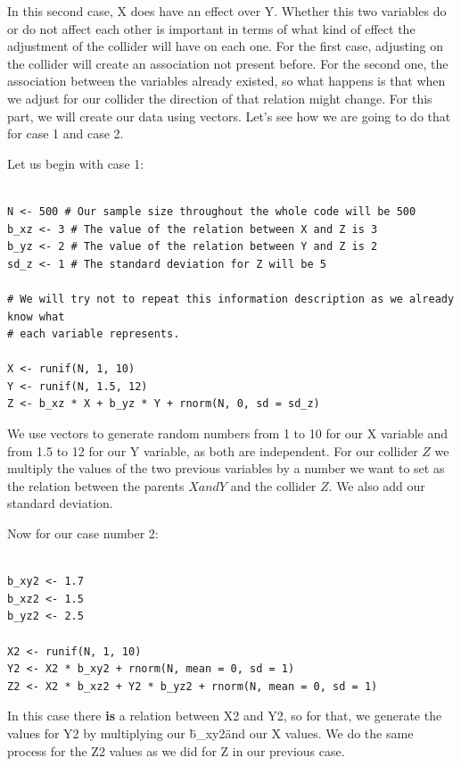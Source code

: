\documentclass{article}
\begin{document}
In this second case, X does have an effect over Y.
Whether this two variables do or do not affect each other is important in terms
of what kind of effect the adjustment of the collider will have on each one. For
the first case, adjusting on the collider will create an association not present
before. For the second one, the association between the variables already existed,
so what happens is that when we adjust for our collider the direction of that 
relation might change. 
For this part, we will create our data using vectors. Let's see how we are going 
to do that for case 1 and case 2.

Let us begin with case 1:

\begin{lstlisting}

N <- 500 # Our sample size throughout the whole code will be 500
b_xz <- 3 # The value of the relation between X and Z is 3
b_yz <- 2 # The value of the relation between Y and Z is 2
sd_z <- 1 # The standard deviation for Z will be 5

# We will try not to repeat this information description as we already know what
# each variable represents.

X <- runif(N, 1, 10)
Y <- runif(N, 1.5, 12)
Z <- b_xz * X + b_yz * Y + rnorm(N, 0, sd = sd_z)

\end{lstlisting}

We use vectors to generate random numbers from 1 to 10 for our X variable and 
from 1.5 to 12 for our Y variable, as both are independent. For our collider \(Z\)
we multiply the values of the two previous variables by a number we want to set
as the relation between the parents \(X and Y\) and the collider \(Z\). We also add
our standard deviation.

Now for our case number 2:

\begin{lstlisting}

b_xy2 <- 1.7 
b_xz2 <- 1.5
b_yz2 <- 2.5

X2 <- runif(N, 1, 10)
Y2 <- X2 * b_xy2 + rnorm(N, mean = 0, sd = 1)
Z2 <- X2 * b_xz2 + Y2 * b_yz2 + rnorm(N, mean = 0, sd = 1)

\end{lstlisting}

In this case there \textbf{is} a relation between X2 and Y2, so for that, we 
generate the values for Y2 by multiplying our \"b\_xy2\" and our X values. We 
do the same process for the Z2 values as we did for Z in our previous case.
\end{document}
